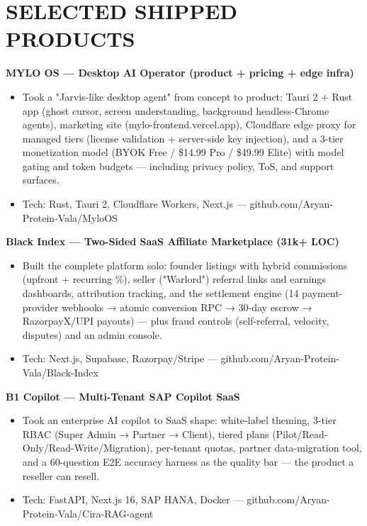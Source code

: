 \documentclass[9pt]{article}
\begin{document}
\section*{SELECTED SHIPPED PRODUCTS}
\textbf{MYLO OS  ---  Desktop AI Operator (product + pricing + edge infra)}
\vspace{1pt}
\begin{itemize}[leftmargin=11pt,itemsep=0pt,topsep=1pt,parsep=0pt]
\item Took a "Jarvis-like desktop agent" from concept to product: Tauri 2 + Rust app (ghost cursor, screen understanding, background headless-Chrome agents), marketing site (mylo-frontend.vercel.app), Cloudflare edge proxy for managed tiers (license validation + server-side key injection), and a 3-tier monetization model (BYOK Free / \$14.99 Pro / \$49.99 Elite) with model gating and token budgets  ---  including privacy policy, ToS, and support surfaces.
\item Tech: Rust, Tauri 2, Cloudflare Workers, Next.js  ---  github.com/Aryan-Protein-Vala/MyloOS
\end{itemize}
\textbf{Black Index  ---  Two-Sided SaaS Affiliate Marketplace (31k+ LOC)}
\vspace{1pt}
\begin{itemize}[leftmargin=11pt,itemsep=0pt,topsep=1pt,parsep=0pt]
\item Built the complete platform solo: founder listings with hybrid commissions (upfront + recurring \%), seller ("Warlord") referral links and earnings dashboards, attribution tracking, and the settlement engine (14 payment-provider webhooks → atomic conversion RPC → 30-day escrow → RazorpayX/UPI payouts)  ---  plus fraud controls (self-referral, velocity, disputes) and an admin console.
\item Tech: Next.js, Supabase, Razorpay/Stripe  ---  github.com/Aryan-Protein-Vala/Black-Index
\end{itemize}
\textbf{B1 Copilot  ---  Multi-Tenant SAP Copilot SaaS}
\vspace{1pt}
\begin{itemize}[leftmargin=11pt,itemsep=0pt,topsep=1pt,parsep=0pt]
\item Took an enterprise AI copilot to SaaS shape: white-label theming, 3-tier RBAC (Super Admin → Partner → Client), tiered plans (Pilot/Read-Only/Read-Write/Migration), per-tenant quotas, partner data-migration tool, and a 60-question E2E accuracy harness as the quality bar  ---  the product a reseller can resell.
\item Tech: FastAPI, Next.js 16, SAP HANA, Docker  ---  github.com/Aryan-Protein-Vala/Cira-RAG-agent
\end{itemize}
\end{document}
